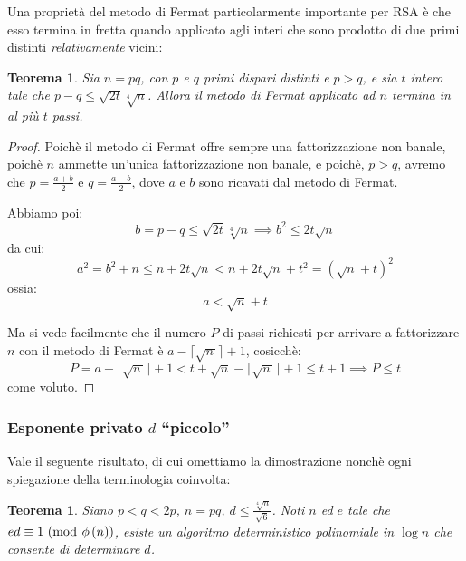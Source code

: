 \documentclass[pdflatex,11pt,a4paper,oneside]{article}
\let\OldEmph\emph
\renewcommand{\emph}[1]{\OldEmph{#1\/}}
\newcommand{\p}[1]{\left({#1}\right)}
\newcommand{\ephi}[1]{\ensuremath{\phi\p{#1}}}
\newcommand{\congruent}[0]{\equiv}
\newcommand{\mmodop}[0]{\ensuremath{\operatorname{mod}}}
\newcommand{\mmod}[1]{\ensuremath{\allowbreak\ (\mmodop\:{#1})}}
\newcommand{\csqrtn}[0]{\big\lceil{\sqrt{n\,}}\big\rceil}
\newtheorem{theorem}[TheoremLike]{Teorema}
\begin{document}
\medskip
Una propriet\`a del metodo di Fermat particolarmente importante per RSA
\`e che esso termina in fretta quando applicato agli interi che sono
prodotto di due primi distinti \emph{relativamente} vicini:
\begin{theorem}
Sia $n = pq$, con $p$ e $q$ primi dispari distinti e $p > q$, e sia
$t$ intero tale che $p - q \leq \sqrt{2t}\sqrt[4]{n}$. Allora il metodo
di Fermat applicato ad $n$ termina in al pi\`u $t$ passi.
\end{theorem}
\begin{proof}
Poich\`e il metodo di Fermat offre sempre una fattorizzazione non banale,
poich\`e $n$ ammette un'unica fattorizzazione non banale, e poich\`e,
$p > q$, avremo che $p = \frac{a + b}{2}$ e $q = \frac{a - b}{2}$, dove
$a$ e $b$ sono ricavati dal metodo di Fermat.

\medskip\noindent
Abbiamo poi:
\begin{displaymath}
  b = p - q \leq \sqrt{2t}\sqrt[4]{n} \implies b^2 \leq 2t\sqrt{n}
\end{displaymath}
da cui:
\begin{displaymath}
  a^2 = b^2 + n \leq n + 2t\sqrt{n} <  n + 2t\sqrt{n} + t^2 =
        \p{\sqrt{n} + t}^2
\end{displaymath}
ossia:
 $$ a < \sqrt{n} + t $$

Ma si vede facilmente che il numero $P$ di passi richiesti per arrivare a
fattorizzare $n$ con il metodo di Fermat \`e $a - \csqrtn + 1$,
cosicch\`e:
\begin{displaymath}
 P = a - \csqrtn + 1 < t + \sqrt{n} - \csqrtn + 1 \leq t + 1
 \implies
 P \leq t
\end{displaymath}
come voluto.
\end{proof}

\subsubsection{Esponente privato $d$ ``piccolo''}

Vale il seguente risultato, di cui omettiamo la dimostrazione nonch\`e
ogni spiegazione della terminologia coinvolta:

\begin{theorem}
Siano $p < q < 2p$, $n = pq$, $d \leq \frac{\sqrt[4]{n}}{\sqrt{6}}$.
Noti $n$ ed $e$ tale che $ed \congruent 1 \mmod{\ephi{n}}$, esiste un
algoritmo deterministico polinomiale in $\log n$ che consente di
determinare $d$.
\end{theorem}

\end{document}
